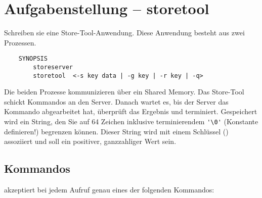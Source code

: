 




\section*{Aufgabenstellung -- storetool}

Schreiben sie eine Store-Tool-Anwendung. Diese Anwendung besteht aus zwei
Prozessen.

\begin{verbatim}
    SYNOPSIS
        storeserver
        storetool  <-s key data | -g key | -r key | -q>
\end{verbatim}

Die beiden Prozesse kommunizieren über ein Shared Memory. Das Store-Tool
schickt Kommandos an den Server. Danach wartet es, bis der Server das Kommando
abgearbeitet hat, überprüft das Ergebnis und terminiert.
Gespeichert wird ein String, den Sie auf 64 Zeichen inklusive terminierendem
\verb_'\0'_ (Konstante definieren!) begrenzen können. Dieser String wird mit
einem Schlüssel () assoziiert und soll ein positiver, ganzzahliger
Wert sein.

\subsection*{Kommandos}

 akzeptiert bei jedem Aufruf genau eines der folgenden
Kommandos:

